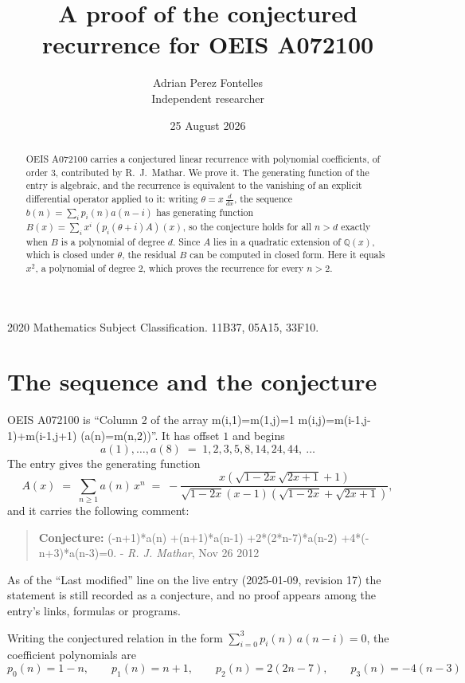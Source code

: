 \documentclass[11pt,a4paper]{article}
\title{A proof of the conjectured recurrence for OEIS A072100}
\author{Adrian Perez Fontelles\\ \small Independent researcher}
\date{25 August 2026}
\theoremstyle{plain}
\theoremstyle{definition}
\begin{document}
\maketitle

\begin{abstract}
OEIS A072100 carries a conjectured linear recurrence with polynomial coefficients, of
order 3, contributed by R.~J.~Mathar. We prove it. The generating function of the
entry is algebraic, and the recurrence is equivalent to the vanishing of an explicit
differential operator applied to it: writing $\theta=x\,\frac{d}{dx}$, the sequence
$b(n)=\sum_{i}p_{i}(n)a(n-i)$ has generating function
$B(x)=\sum_{i}x^{i}\,(p_{i}(\theta+i)A)(x)$, so the conjecture holds for all $n>d$ exactly
when $B$ is a polynomial of degree $d$. Since $A$ lies in a quadratic extension of
$\mathbb{Q}(x)$, which is closed under $\theta$, the residual $B$ can be computed in
closed form. Here it equals $x^{2}$, a polynomial of degree $2$, which proves
the recurrence for every $n>2$.
\end{abstract}

\noindent\small 2020 Mathematics Subject Classification. 11B37, 05A15, 33F10.\normalsize

\section{The sequence and the conjecture}

OEIS A072100 is ``Column 2 of the array m(i,1)=m(1,j)=1 m(i,j)=m(i-1,j-1)+m(i-1,j+1) (a(n)=m(n,2))''. It has offset $1$ and begins
\[
a(1),\dots,a(8)\;=\;1, 2, 3, 5, 8, 14, 24, 44,\ \dots
\]
The entry gives the generating function
\begin{equation}\label{eq:gf}
A(x)\;=\;\sum_{n\ge 1} a(n)\,x^{n}\;=\;- \frac{x \left(\sqrt{1 - 2 x} \sqrt{2 x + 1} + 1\right)}{\sqrt{1 - 2 x} \left(x - 1\right) \left(\sqrt{1 - 2 x} + \sqrt{2 x + 1}\right)} ,
\end{equation}
and it carries the following comment:
\begin{quote}\small
\textbf{Conjecture:} (-n+1)*a(n) +(n+1)*a(n-1) +2*(2*n-7)*a(n-2) +4*(-n+3)*a(n-3)=0. - \emph{R. J. Mathar}, Nov 26 2012
\end{quote}
As of the ``Last modified'' line on the live entry (2025-01-09, revision 17) the
statement is still recorded as a conjecture, and no proof appears among the entry's links,
formulas or programs.

Writing the conjectured relation in the form $\sum_{i=0}^{3}p_{i}(n)\,a(n-i)=0$,
the coefficient polynomials are
\[
p_{0}(n)=1 - n,\qquad p_{1}(n)=n + 1,\qquad p_{2}(n)=2 \left(2 n - 7\right),\qquad p_{3}(n)=- 4 \left(n - 3\right)
\]
\end{document}
